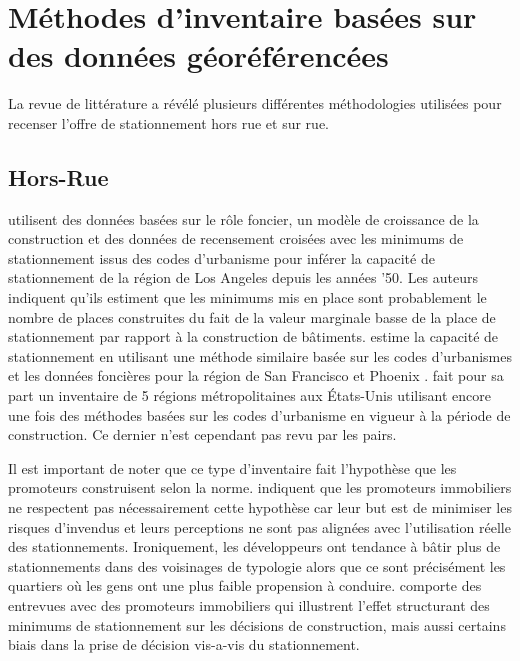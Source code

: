 \section{Méthodes d'inventaire basées sur des données géoréférencées}
La revue de littérature a révélé plusieurs différentes méthodologies utilisées pour recenser l'offre de stationnement hors rue et sur rue. 
\subsection{Hors-Rue}
\textcite{Chester:ParkingInfrastructure:2015} utilisent des données basées sur le rôle foncier, un modèle de croissance de la construction et des données de recensement croisées avec les minimums de stationnement issus des codes d'urbanisme pour inférer la capacité de stationnement de la région de Los Angeles depuis les années '50. Les auteurs indiquent qu'ils estiment que les minimums mis en place sont probablement le nombre de places construites du fait de la valeur marginale basse de la place de stationnement par rapport à la construction de bâtiments. \citeauthor{Chester:InventoryingSan:2022} estime la capacité de stationnement en utilisant une méthode similaire basée sur les codes d'urbanismes et les données foncières pour la région de San Francisco \parencite{Chester:InventoryingSan:2022} et Phoenix \parencite{Hoehne:ValleySundrenched:2019}. \textcite{Scharnhorst:QuantifiedParking:2018} fait pour sa part un inventaire de 5 régions métropolitaines aux États-Unis utilisant encore une fois des méthodes basées sur les codes d'urbanisme en vigueur à la période de construction. Ce dernier n'est cependant pas revu par les pairs. \par 
Il est important de noter que ce type d'inventaire fait l'hypothèse que les promoteurs construisent selon la norme. \textcite{Stangl:ParkingLots:2019} indiquent que les promoteurs immobiliers ne respectent pas nécessairement cette hypothèse car leur but est de minimiser les risques d'invendus et leurs perceptions ne sont pas alignées avec l'utilisation réelle des stationnements. Ironiquement, les développeurs ont tendance à bâtir plus de stationnements dans des voisinages de typologie  \fg{} \parencite{Voulgaris:SynergisticNeighborhood:2017} alors que ce sont précisément les quartiers où les gens ont une plus faible propension à conduire. \textcite{Stangl:ParkingLots:2019} comporte des entrevues avec des promoteurs immobiliers qui illustrent l'effet structurant des minimums de stationnement sur les décisions de construction, mais aussi certains biais dans la prise de décision vis-a-vis du stationnement.
